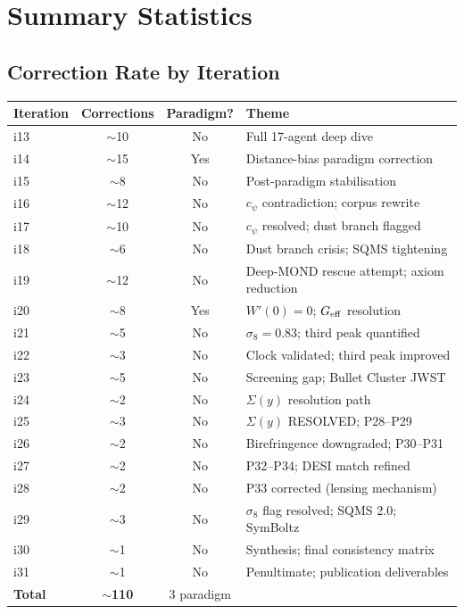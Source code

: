 \documentclass[11pt,a4paper]{article}
\begin{document}
\section{Summary Statistics}
\label{sec:statistics}

\subsection{Correction Rate by Iteration}

\begin{center}
\begin{tabular}{lccl}
\toprule
\textbf{Iteration} & \textbf{Corrections} & \textbf{Paradigm?} & \textbf{Theme} \\
\midrule
i13 & $\sim$10 & No & Full 17-agent deep dive \\
i14 & $\sim$15 & Yes & Distance-bias paradigm correction \\
i15 & $\sim$8 & No & Post-paradigm stabilisation \\
i16 & $\sim$12 & No & $c_\psi$ contradiction; corpus rewrite \\
i17 & $\sim$10 & No & $c_\psi$ resolved; dust branch flagged \\
i18 & $\sim$6 & No & Dust branch crisis; SQMS tightening \\
i19 & $\sim$12 & No & Deep-MOND rescue attempt; axiom reduction \\
i20 & $\sim$8 & Yes & $W'(0) = 0$; $G_{\rm eff}$ resolution \\
i21 & $\sim$5 & No & $\sigma_8 = 0.83$; third peak quantified \\
i22 & $\sim$3 & No & Clock validated; third peak improved \\
i23 & $\sim$5 & No & Screening gap; Bullet Cluster JWST \\
i24 & $\sim$2 & No & $\Sigma(y)$ resolution path \\
i25 & $\sim$3 & No & $\Sigma(y)$ RESOLVED; P28--P29 \\
i26 & $\sim$2 & No & Birefringence downgraded; P30--P31 \\
i27 & $\sim$2 & No & P32--P34; DESI match refined \\
i28 & $\sim$2 & No & P33 corrected (lensing mechanism) \\
i29 & $\sim$3 & No & $\sigma_8$ flag resolved; SQMS 2.0; SymBoltz \\
i30 & $\sim$1 & No & Synthesis; final consistency matrix \\
i31 & $\sim$1 & No & Penultimate; publication deliverables \\
\midrule
\textbf{Total} & $\sim$\textbf{110} & 3 paradigm & \\
\bottomrule
\end{tabular}
\end{center}
\end{document}
